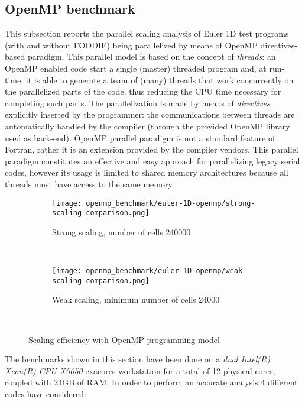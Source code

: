 \subsection{OpenMP benchmark}\label{subsec:openmp}

This subsection reports the parallel scaling analysis of Euler 1D test programs (with and without FOODIE) being parallelized by means of OpenMP directives-based paradigm. This parallel model is based on the concept of \emph{threads}: an OpenMP enabled code start a single (master) threaded program and, at run-time, it is able to generate a team of (many) threads that work concurrently on the parallelized parts of the code, thus reducing the CPU time necessary for completing such parts. The parallelization is made by means of \emph{directives} explicitly inserted by the programmer: the communications between threads are automatically handled by the compiler (through the provided OpenMP library used as back-end). OpenMP parallel paradigm is not a standard feature of Fortran, rather it is an extension provided by the compiler vendors. This parallel paradigm constitutes an effective and easy approach for parallelizing legacy serial codes, however its usage is limited to shared memory architectures because all threads must have access to the same memory.

\begin{figure}[!ht]
  \centering
  \begin{subfigure}[b]{0.80\textwidth}
    \centering
    \texttt{[image: openmp\_benchmark/euler-1D-openmp/strong-scaling-comparison.png]}
    \caption{Strong scaling, number of cells 240000}\label{fig:strong-scaling-openmp}
  \end{subfigure}\\
  \begin{subfigure}[b]{0.80\textwidth}
    \centering
    \texttt{[image: openmp\_benchmark/euler-1D-openmp/weak-scaling-comparison.png]}
    \caption{Weak scaling, minimum number of cells 24000}\label{fig:weak-scaling-openmp}
  \end{subfigure}\\
  \caption{Scaling efficiency with OpenMP programming model}\label{fig:scaling-openmp}
\end{figure}

The benchmarks shown in this section have been done on a \emph{dual Intel(R) Xeon(R) CPU X5650} exacores workstation for a total of 12 physical cores, coupled with 24GB of RAM. In order to perform an accurate analysis 4 different codes have considered:

